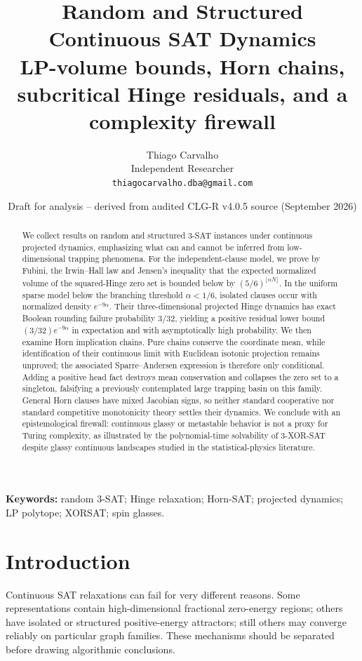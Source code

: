 \documentclass[11pt,a4paper]{article}
\title{Random and Structured Continuous SAT Dynamics\\\large LP-volume bounds, Horn chains, subcritical Hinge residuals, and a complexity firewall}
\author{Thiago Carvalho\\Independent Researcher\\\texttt{thiagocarvalho.dba@gmail.com}}
\date{Draft for analysis -- derived from audited CLG-R v4.0.5 source (September 2026)}
\begin{document}
\maketitle
\begin{abstract}
We collect results on random and structured 3-SAT instances under continuous projected dynamics, emphasizing what can and cannot be inferred from low-dimensional trapping phenomena. For the independent-clause model, we prove by Fubini, the Irwin--Hall law and Jensen's inequality that the expected normalized volume of the squared-Hinge zero set is bounded below by $(5/6)^{\lfloor\alpha N\rfloor}$. In the uniform sparse model below the branching threshold $\alpha<1/6$, isolated clauses occur with normalized density $e^{-9\alpha}$. Their three-dimensional projected Hinge dynamics has exact Boolean rounding failure probability $3/32$, yielding a positive residual lower bound $(3/32)e^{-9\alpha}$ in expectation and with asymptotically high probability. We then examine Horn implication chains. Pure chains conserve the coordinate mean, while identification of their continuous limit with Euclidean isotonic projection remains unproved; the associated Sparre--Andersen expression is therefore only conditional. Adding a positive head fact destroys mean conservation and collapses the zero set to a singleton, falsifying a previously contemplated large trapping basin on this family. General Horn clauses have mixed Jacobian signs, so neither standard cooperative nor standard competitive monotonicity theory settles their dynamics. We conclude with an epistemological firewall: continuous glassy or metastable behavior is not a proxy for Turing complexity, as illustrated by the polynomial-time solvability of 3-XOR-SAT despite glassy continuous landscapes studied in the statistical-physics literature.
\end{abstract}
\noindent\textbf{Keywords:} random 3-SAT; Hinge relaxation; Horn-SAT; projected dynamics; LP polytope; XORSAT; spin glasses.

\section{Introduction}
Continuous SAT relaxations can fail for very different reasons. Some representations contain high-dimensional fractional zero-energy regions; others have isolated or structured positive-energy attractors; still others may converge reliably on particular graph families. These mechanisms should be separated before drawing algorithmic conclusions.
\end{document}
